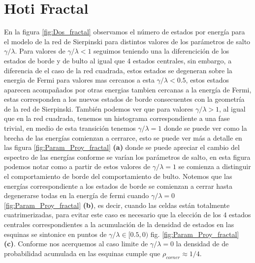 \section{Hoti Fractal}




En la figura \ref{fig:Dos_fractal} observamos el número de estados por energía para el modelo de la red de Sierpinski para distintos valores de los parámetros de salto $\gamma/\lambda$. Para valores de $\gamma/\lambda < 1$ seguimos teniendo una la diferencición de los estados de borde y de bulto al igual que 4 estados centrales, sin embargo, a diferencia de el caso de la red cuadrada, estos estados se degeneran sobre la energia de Fermi para valores mas cercanos a esta  $\gamma/\lambda < 0.5$, estos estados aparecen acompañados por otras energias tambien cercanas a la energía de Fermi, estas corresponden a los nuevos estados de borde consecuentes con la geometría de la red de Sierpinski. También podemos ver que para valores $\gamma/\lambda > 1$, al igual que en la red cuadrada, tenemos un histograma correspondiente a una fase trivial, en medio de esta transición tenemos $\gamma/\lambda = 1$ donde se puede ver como la brecha de las energías comienzan a cerrarce, esto se puede ver más a detalle en las figura \ref{fig:Param_Proy_fractal} \textbf{(a)} donde se puede apreciar el cambio del espectro de las energías conforme se varían los parámetros de salto, en esta figura podemos notar como a partir de estos valores de $\gamma/\lambda = 1$ se comienza a distinguir el comportamiento de borde del comportamiento de bulto. Notemos que las energías correspondiente a los estados de borde se comienzan a cerrar hasta degenerarse todas en la energía de fermi cuando $\gamma/\lambda = 0$ \ref{fig:Param_Proy_fractal} \textbf{(b)}, es decir, cuando las celdas están totalmente cuatrimerizadas, para evitar este caso es necesario que la elección de los 4 estados centrales correspondientes a la acumulación de la densidad de estados en las esquinas se sintonice en puntos de $\gamma/\lambda \in [0.5,0)$ fig. \ref{fig:Param_Proy_fractal} \textbf{(c)}. Conforme nos acerquemos al caso limite de $\gamma/\lambda = 0$ la densidad de de probabilidad acumulada en las esquinas cumple que $\rho_{corner} \approx 1/4$.




